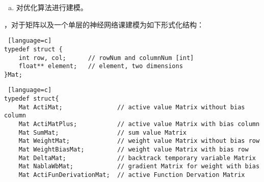 \begin{enumerate}[(1)]
\begin{enumerate}[(a)]
    \item 对优化算法进行建模。
  \end{enumerate}

  ，对于矩阵以及一个单层的神经网络课建模为如下形式化结构：
  \begin{lstlisting} [language=c]
typedef struct {
	int row, col;      // rowNum and columnNum [int]
	float** element;   // element, two dimensions
}Mat;
\end{lstlisting}
\begin{lstlisting} [language=c]
typedef struct{
	Mat ActiMat;               // active value Matrix without bias column
	Mat ActiMatPlus;           // active value Matrix with bias column
	Mat SumMat;                // sum value Matrix
	Mat WeightMat;             // weight value Matrix without bias row
	Mat WeightBiasMat;         // weight value Matrix with bias row
	Mat DeltaMat;              // backtrack temporary variable Matrix
	Mat NablaWbMat;            // gradient Matrix for weight with bias
	Mat ActiFunDerivationMat;  // active Function Dervation Matrix


\end{lstlisting}
\end{enumerate}
